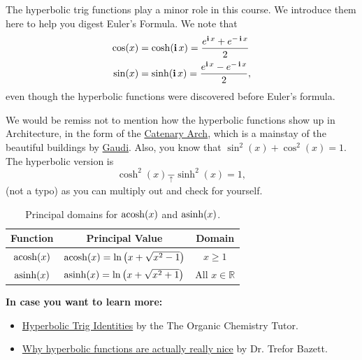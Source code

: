 \bigskip

The hyperbolic trig functions play a minor role in this course. We introduce them here to help you digest Euler's Formula. We note that
\begin{equation}
\begin{aligned}
    \cos(x) &= \cosh(\mathop{\bm{\mathrm i}} x) = \frac{ e^{\mathop{\bm{\mathrm i}} x} + e^{-\mathop{\bm{\mathrm i}} x}}{2}\\
    \sin(x) &= \sinh(\mathop{\bm{\mathrm i}} x) = \frac{ e^{\mathop{\bm{\mathrm i}} x} - e^{-\mathop{\bm{\mathrm i}} x}}{2},
\end{aligned}
\end{equation}
even though the hyperbolic functions were discovered before Euler's formula. 

We would be remiss not to mention how the hyperbolic functions show up in Architecture, in the form of the \href{https://en.wikipedia.org/wiki/Catenary_arch}{Catenary Arch}, which is a mainstay of the beautiful buildings by \href{https://en.wikipedia.org/wiki/Antoni_Gaud%C3%AD#:~:text=Quest%20for%20a%20new%20architectural%20language}{Gaudi}. Also, you know that $\sin^2(x) + \cos^2(x) = 1$. The hyperbolic version is
$$\cosh^2(x) \underset{\uparrow}{-} \sinh^2(x)  =  1,$$
(not a typo) as you can multiply out and check for yourself. \\

\begin{table}[ht]
\renewcommand{\arraystretch}{1.5}
\centering
\begin{tabular}{|c|c|c|}
\hline
\textbf{Function} & \textbf{Principal Value} & \textbf{Domain} \\
\hline
\(\mathrm{acosh}(x)\) & \(\mathrm{acosh}(x) = \ln\left(x + \sqrt{x^2 - 1}\right)\) & \(x \geq 1\) \\
\hline
\(\mathrm{asinh}(x)\) & \(\mathrm{asinh}(x) = \ln\left(x + \sqrt{x^2 + 1}\right)\) & All \(x \in \mathbb{R}\) \\
\hline
\end{tabular}
\caption{Principal domains for \(\mathrm{acosh}(x)\) and \(\mathrm{asinh}(x)\).}
\label{tab:PrincipalDomainsHyperbolicInverseFunctions}
\end{table}

\bigskip

\textbf{In case you want to learn more:}
\begin{itemize}
    \item \href{https://youtu.be/m9nwdn55Z2w}{Hyperbolic Trig Identities} by the The Organic Chemistry Tutor.
    \item \href{https://www.youtube.com/watch?v=HnHnEnkZpJA}{Why hyperbolic functions are actually really nice} by Dr. Trefor Bazett.
\end{itemize}




